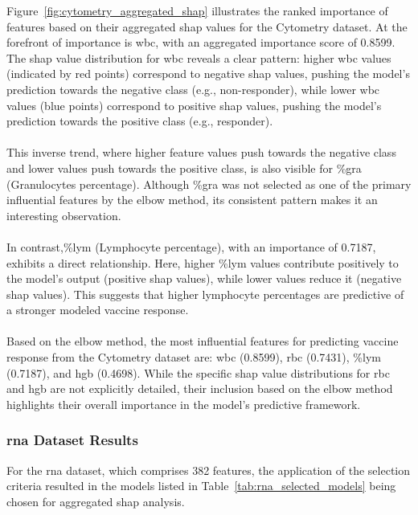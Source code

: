 \documentclass[12pt,a4paper]{report}
\begin{document}
\noindent
Figure~\ref{fig:cytometry_aggregated_shap} illustrates the ranked importance of features based on their aggregated \gls{shap} values for the Cytometry dataset. At the forefront of importance is \gls{wbc}, with an aggregated importance score of 0.8599. The \gls{shap} value distribution for \gls{wbc} reveals a clear pattern: higher \gls{wbc} values (indicated by red points) correspond to negative \gls{shap} values, pushing the model's prediction towards the negative class (e.g., non-responder), while lower \gls{wbc} values (blue points) correspond to positive \gls{shap} values, pushing the model's prediction towards the positive class (e.g., responder).\\
\\
This inverse trend, where higher feature values push towards the negative class and lower values push towards the positive class, is also visible for \%\acrshort{gra} (Granulocytes percentage). Although \%\acrshort{gra} was not selected as one of the primary influential features by the elbow method, its consistent pattern makes it an interesting observation.\\
\\
In contrast,\%\acrshort{lym} (Lymphocyte percentage), with an importance of 0.7187, exhibits a direct relationship. Here, higher \%\acrshort{lym} values contribute positively to the model's output (positive \gls{shap} values), while lower values reduce it (negative \gls{shap} values). This suggests that higher lymphocyte percentages are predictive of a stronger modeled vaccine response.\\
\\
Based on the elbow method, the most influential features for predicting vaccine response from the Cytometry dataset are: \gls{wbc} (0.8599), \acrshort{rbc} (0.7431), \%\acrshort{lym} (0.7187), and \acrshort{hgb} (0.4698). While the specific \gls{shap} value distributions for \acrshort{rbc} and \acrshort{hgb} are not explicitly detailed, their inclusion based on the elbow method highlights their overall importance in the model's predictive framework.

\subsubsection*{\acrshort{rna} Dataset Results}
\noindent
For the \acrshort{rna} dataset, which comprises 382 features, the application of the selection criteria resulted in the models listed in Table~\ref{tab:rna_selected_models} being chosen for aggregated \gls{shap} analysis.
\end{document}
